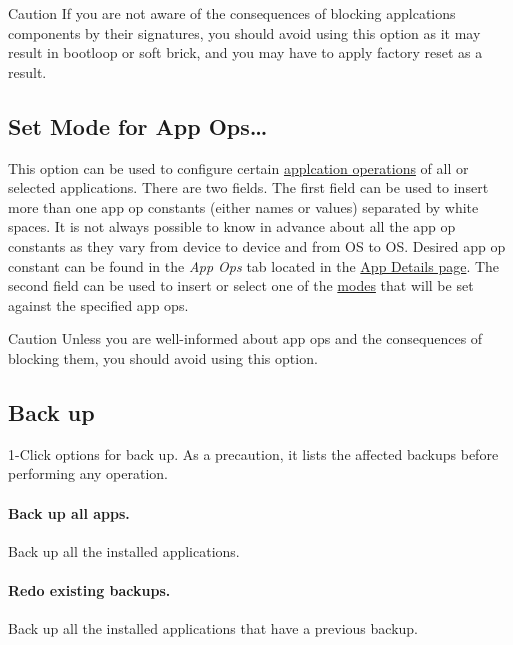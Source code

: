 \begin{danger}{Caution}
    If you are not aware of the consequences of blocking applcations components by their signatures, you should avoid
    using this option as it may result in bootloop or soft brick, and you may have to apply factory reset as a result.
\end{danger}

\subsection{Set Mode for App Ops\dots}\label{subsec:set-mode-for-app-ops-dots} %
This option can be used to configure certain \hyperref[ch:app-ops]{applcation operations} of all or selected applications.
There are two fields. The first field can be used to insert more than one app op constants (either names or values) separated by white spaces.
It is not always possible to know in advance about all the app op constants as they vary from device to device and from OS to OS\@.
Desired app op constant can be found in the \textit{App Ops} tab located in the \hyperref[sec:app-details-page]{App Details page}.
The second field can be used to insert or select one of the \hyperref[subsec:mode-constants]{modes} that will be set against the specified app ops.

\begin{danger}{Caution}
    Unless you are well-informed about app ops and the consequences of blocking them, you should avoid using this option.
\end{danger}

\subsection{Back up}\label{subsec:1-click-back-up} %
1-Click options for back up. As a precaution, it lists the affected backups before performing any operation.

\paragraph{Back up all apps.} Back up all the installed applications.

\paragraph{Redo existing backups.} Back up all the installed applications that have a previous backup.

